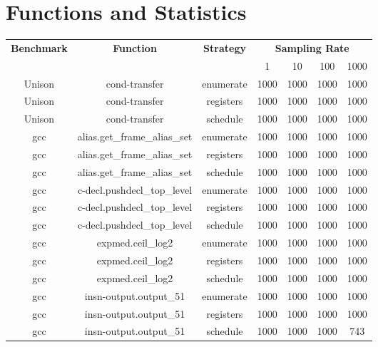 
\section{Functions and Statistics}

\begin{center}
	\begingroup
	\setlength{\LTleft}{-20cm plus -1fill}
	\setlength{\LTright}{\LTleft}
	\begin{longtable}{c|c|c|c|c|c|c}
		\multirow{2}{*}{\textbf{Benchmark}} & \multirow{2}{*}{\textbf{Function}} & \multirow{2}{*}{\textbf{Strategy}} & \multicolumn{4}{c}{\textbf{Sampling Rate}} \\
		\cline{4-7}
		& & & 1 & 10 & 100 & 1000 \\ \hline
		\endhead
		Unison & cond-transfer & enumerate & 1000 & 1000 & 1000 & 1000 \\
		Unison & cond-transfer & registers & 1000 & 1000 & 1000 & 1000 \\
		Unison & cond-transfer & schedule & 1000 & 1000 & 1000 & 1000 \\
		\hline
		gcc & alias.get\_frame\_alias\_set & enumerate & 1000 & 1000 & 1000 & 1000 \\
		gcc & alias.get\_frame\_alias\_set & registers & 1000 & 1000 & 1000 & 1000 \\
		gcc & alias.get\_frame\_alias\_set & schedule & 1000 & 1000 & 1000 & 1000 \\
		\hline
		gcc & c-decl.pushdecl\_top\_level & enumerate & 1000 & 1000 & 1000 & 1000 \\
		gcc & c-decl.pushdecl\_top\_level & registers & 1000 & 1000 & 1000 & 1000 \\
		gcc & c-decl.pushdecl\_top\_level & schedule & 1000 & 1000 & 1000 & 1000 \\
		\hline
		gcc & expmed.ceil\_log2 & enumerate & 1000 & 1000 & 1000 & 1000 \\
		gcc & expmed.ceil\_log2 & registers & 1000 & 1000 & 1000 & 1000 \\
		gcc & expmed.ceil\_log2 & schedule & 1000 & 1000 & 1000 & 1000 \\
		\hline
		gcc & insn-output.output\_51 & enumerate & 1000 & 1000 & 1000 & 1000 \\
		gcc & insn-output.output\_51 & registers & 1000 & 1000 & 1000 & 1000 \\
		gcc & insn-output.output\_51 & schedule & 1000 & 1000 & 1000 & 743 \\
		\hline

\end{longtable}
\end{center}
